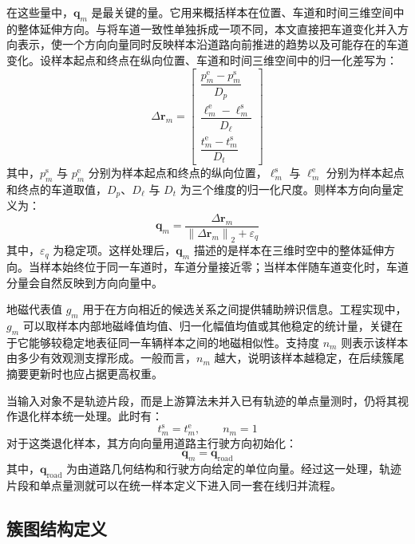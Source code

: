 \documentclass{xdupgthesis}
\begin{document}
在这些量中，$\mathbf{q}_m$ 是最关键的量。它用来概括样本在位置、车道和时间三维空间中的整体延伸方向。与将车道一致性单独拆成一项不同，本文直接把车道变化并入方向表示，使一个方向向量同时反映样本沿道路向前推进的趋势以及可能存在的车道变化。设样本起点和终点在纵向位置、车道和时间三维空间中的归一化差写为：
\begin{equation}
	\Delta \mathbf{r}_m=
	\begin{bmatrix}
		\dfrac{p_m^{\mathrm{e}}-p_m^{\mathrm{s}}}{D_p}\\[8pt]
		\dfrac{\ell_m^{\mathrm{e}}-\ell_m^{\mathrm{s}}}{D_{\ell}}\\[8pt]
		\dfrac{t_m^{\mathrm{e}}-t_m^{\mathrm{s}}}{D_t}
	\end{bmatrix}
\end{equation}
其中，$p_m^{\mathrm{s}}$ 与 $p_m^{\mathrm{e}}$ 分别为样本起点和终点的纵向位置，$\ell_m^{\mathrm{s}}$ 与 $\ell_m^{\mathrm{e}}$ 分别为样本起点和终点的车道取值，$D_p$、$D_{\ell}$ 与 $D_t$ 为三个维度的归一化尺度。则样本方向向量定义为：
\begin{equation}
	\mathbf{q}_m=
	\frac{\Delta \mathbf{r}_m}{\left\|\Delta \mathbf{r}_m\right\|_2+\varepsilon_q}
\end{equation}
其中，$\varepsilon_q$ 为稳定项。这样处理后，$\mathbf{q}_m$ 描述的是样本在三维时空中的整体延伸方向。当样本始终位于同一车道时，车道分量接近零；当样本伴随车道变化时，车道分量会自然反映到方向向量中。

地磁代表值 $g_m$ 用于在方向相近的候选关系之间提供辅助辨识信息。工程实现中，$g_m$ 可以取样本内部地磁峰值均值、归一化幅值均值或其他稳定的统计量，关键在于它能够较稳定地表征同一车辆样本之间的地磁相似性。支持度 $n_m$ 则表示该样本由多少有效观测支撑形成。一般而言，$n_m$ 越大，说明该样本越稳定，在后续簇尾摘要更新时也应占据更高权重。

当输入对象不是轨迹片段，而是上游算法未并入已有轨迹的单点量测时，仍将其视作退化样本统一处理。此时有：
\begin{equation}
	t_m^{\mathrm{s}}=t_m^{\mathrm{e}},\qquad n_m=1
\end{equation}
对于这类退化样本，其方向向量用道路主行驶方向初始化：
\begin{equation}
	\mathbf{q}_m=\mathbf{q}_{\mathrm{road}}
\end{equation}
其中，$\mathbf{q}_{\mathrm{road}}$ 为由道路几何结构和行驶方向给定的单位向量。经过这一处理，轨迹片段和单点量测就可以在统一样本定义下进入同一套在线归并流程。


\subsection{簇图结构定义}
\end{document}
